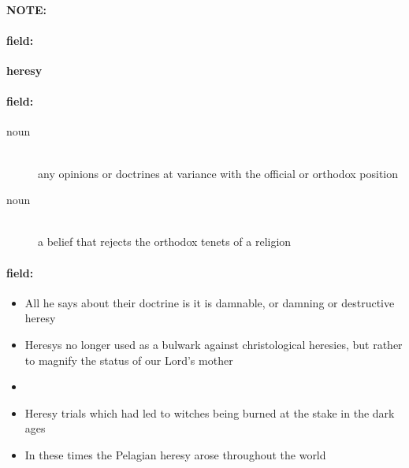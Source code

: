 \documentclass[12pt]{article}
\newenvironment{note}{\paragraph{NOTE:}}{}
\newenvironment{field}{\paragraph{field:}}{}
\begin{document}
\begin{note}
\begin{field}
\textbf{\large heresy}
\end{field}


\begin{field}
\begin{description}
\item[noun] \hfill \\ 
any opinions or doctrines at variance with the official or orthodox position

\item[noun] \hfill \\ 
a belief that rejects the orthodox tenets of a religion

\end{description}
\end{field}

\begin{field}
\begin{itemize}
\item All he says about their doctrine is it is damnable, or damning or destructive heresy
\item Heresys no longer used as a bulwark against christological heresies, but rather to magnify the status of our Lord's mother
\item 
\item Heresy trials which had led to witches being burned at the stake in the dark ages
\item In these times the Pelagian heresy arose throughout the world
\end{itemize}
\end{field}
\end{note}
\end{document}

